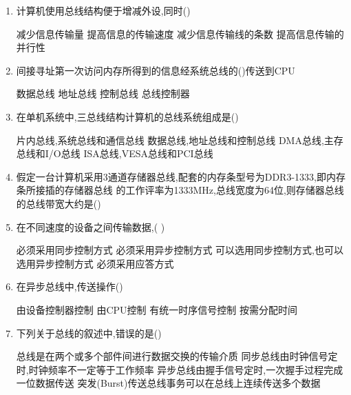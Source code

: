 \documentclass[12pt, a4paper, oneside, UTF8]{ctexbook}
\begin{document}
\begin{enumerate}
    \item 计算机使用总线结构便于增减外设,同时() 
    \begin{choices}
        \task 减少信息传输量 
        \task 提高信息的传输速度 
        \task 减少信息传输线的条数 
        \task 提高信息传输的并行性 
    \end{choices}

    \item 间接寻址第一次访问内存所得到的信息经系统总线的()传送到CPU 
    \begin{choices}
        \task 数据总线 
        \task 地址总线 
        \task 控制总线 
        \task 总线控制器 
    \end{choices}

    \item 在单机系统中,三总线结构计算机的总线系统组成是() 
    \begin{choices}[1]
        \task 片内总线,系统总线和通信总线
        \task 数据总线,地址总线和控制总线 
        \task DMA总线,主存总线和I/O总线 
        \task ISA总线,VESA总线和PCI总线
    \end{choices} 
    
    \item \bl 假定一台计算机采用3通道存储器总线,配套的内存条型号为DDR3-1333,即内存条所接插的存储器总线
    的工作评率为1333MHz,总线宽度为64位,则存储器总线的总线带宽大约是()

    \item 在不同速度的设备之间传输数据,(  ) 
    \begin{choices}[1]
        \task 必须采用同步控制方式 
        \task 必须采用异步控制方式 
        \task 可以选用同步控制方式,也可以选用异步控制方式 
        \task 必须采用应答方式
    \end{choices}

    \item 在异步总线中,传送操作() 
    \begin{choices}[2]
        \task 由设备控制器控制 
        \task 由CPU控制 
        \task 有统一时序信号控制 
        \task 按需分配时间
    \end{choices}

    \item \bl 下列关于总线的叙述中,错误的是() 
    \begin{choices}[1]
        \task 总线是在两个或多个部件间进行数据交换的传输介质
        \task 同步总线由时钟信号定时,时钟频率不一定等于工作频率 
        \task 异步总线由握手信号定时,一次握手过程完成一位数据传送 
        \task 突发(Burst)传送总线事务可以在总线上连续传送多个数据 
    \end{choices}


\end{enumerate}
\end{document}
